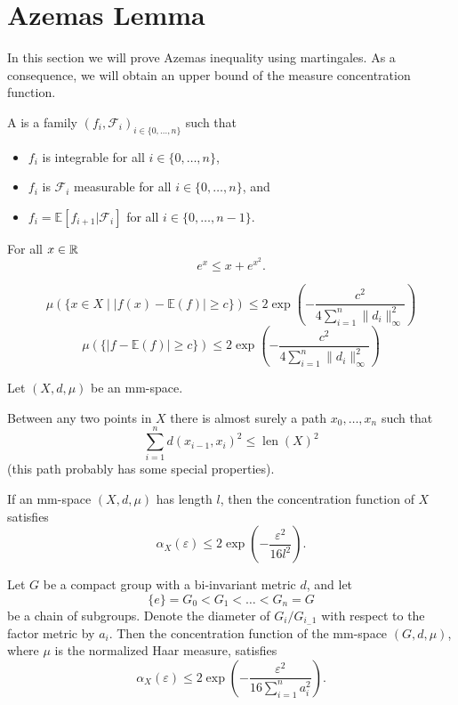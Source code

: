 \section{Azemas Lemma}
In this section we will prove Azemas inequality using martingales. As a consequence, we will obtain an upper bound of the measure concentration function.		

\begin{definition}
A  is a family $(f_i,\mathcal{F}_i)_{i\in \{0,\dots,n\}}$ such that
\begin{itemize}
\item $f_i$ is integrable for all $i\in \{0,\dots,n\}$,
\item $f_i$ is $\mathcal{F}_i$ measurable for all $i\in \{0,\dots,n\}$, and
\item $f_i=\mathbb{E}[f_{i+1}|\mathcal{F}_i]$ for all $i\in \{0,\dots,n-1\}$.
\end{itemize}
\end{definition}

\begin{lemma} For all $x\in\mathbb{R}$
\[e^{x}\leq x+e^{x^2}.\]
\end{lemma}

\begin{lemma}
\[\mu(\{x\in X\mid |f(x)-\mathbb{E}(f)|\geq c\})\leq 2\exp\left(-\frac{c^2}{4\sum_{i=1}^{n}\|d_i\|^2_\infty}\right)\]
\[\mu(\{|f-\mathbb{E}(f)|\geq c\})\leq 2\exp\left(-\frac{c^2}{4\sum_{i=1}^{n}\|d_i\|^2_\infty}\right)\]
\end{lemma}

\begin{definition}\label{def:length}
Let $(X,d,\mu)$ be an mm-space.
\end{definition}

Between any two points in $X$ there is almost surely a path $x_0,\dots,x_n$ such that \[\sum_{i=1}^n d(x_{i-1},x_i)^2\leq \operatorname{len}(X)^2\] (this path probably has some special properties).

\begin{theorem}
If an mm-space $(X,d,\mu)$ has length $l$, then the concentration function of $X$ satisfies
\[\alpha_X(\varepsilon)\leq 2\exp\left(-\frac{\varepsilon^2}{16l^2}\right).\]
\end{theorem}


\begin{theorem}
Let $G$ be a compact group with a bi-invariant metric $d$, and let
\[\{e\}=G_0<G_1<\dots <G_n=G\]
be a chain of subgroups. Denote the diameter of $G_i/G_{i_-1}$ with respect to the factor metric by $a_i$. Then the concentration function of the mm-space $(G,d,\mu)$, where $\mu$ is the normalized Haar measure, satisfies
\[\alpha_X(\varepsilon)\leq 2\exp\left(-\frac{\varepsilon^2}{16\sum_{i=1}^{n}a_i^2}\right).\]
\end{theorem}

